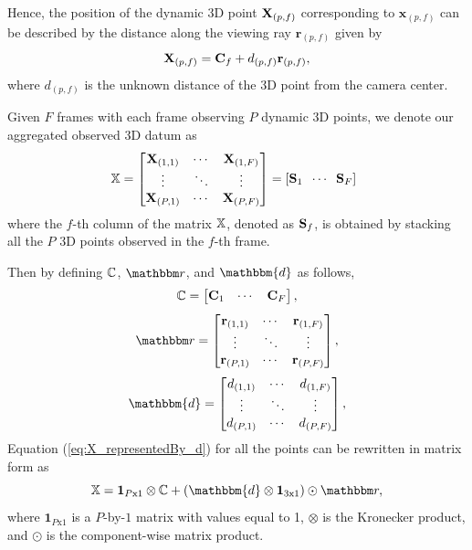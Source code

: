 Hence, the position of the dynamic 3D point $\mathbf X_{(p,f)}$ corresponding to $\mathbf x_{(p,f)}$ can be described by the distance along the viewing ray $\mathbf{r}_{(p,f)}$ given by
\begin{equation}
\mathbf X_{(p,f)} = \mathbf{C}_f + d_{(p,f)} \mathbf{r}_{(p,f)},
\label{eq:X_representedBy_d}
\end{equation}
where %
$d_{(p,f)}$
is the unknown distance of the 3D point from the camera center.

Given $F$ frames with each frame observing $P$ dynamic 3D points, we denote our aggregated observed 3D datum as
\begin{equation}
\label{eq:observationstructure}
\mathbb X =
\begin{bmatrix}
\mathbf X_{(1,1)} & \cdots & \mathbf X_{(1,F)} \\
            \vdots  & \ddots & \vdots              \\
\mathbf X_{(P,1)} & \cdots & \mathbf X_{(P,F)} \\
\end{bmatrix} =
\left[
\mathbf S_1\; \;  \cdots \; \;   \mathbf S_F
\right]\;\;
\end{equation}
where the $f$-th column of the matrix $\mathbb X$, denoted as $\mathbf S_f$, is obtained by stacking all the $P$ 3D points observed in the $f$-th frame.

Then by defining $\mathbb C$, $\allr$, and $\mathbbm{d}$ as follows,
\begin{equation}
\mathbb C =
\begin{bmatrix}
\mathbf C_{1} & \cdots & \mathbf C_{F}
\end{bmatrix},
\end{equation}
\begin{equation}
\allr = 
\begin{bmatrix}
\oner_{(1,1)} & \cdots & \oner_{(1,F)} \\
            \vdots  & \ddots & \vdots              \\
\oner_{(P,1)} & \cdots & \oner_{(P,F)} \\
\end{bmatrix},
\end{equation}
\begin{equation}
\mathbbm{d} =
\begin{bmatrix}
d_{(1,1)} & \cdots & d_{(1,F)} \\
            \vdots  & \ddots & \vdots              \\
d_{(P,1)} & \cdots & d_{(P,F)} \\
\end{bmatrix},
\end{equation}
Equation (\ref{eq:X_representedBy_d}) for all the points can be rewritten in matrix form as
\begin{equation}
\allX = \mathbf{1}_{P\text{x}1} \otimes \allC + 
(\mathbbm{d} \otimes \mathbf{1}_{3\text{x}1}) \odot \allr,
\label{eq:X_representedBy_d_all}
\end{equation}
where $\mathbf{1}_{P\text{x}1}$ is a $P$-by-$1$ matrix with values equal to 1, $\otimes$ is the Kronecker product, and $\odot$ is the component-wise matrix product. %

